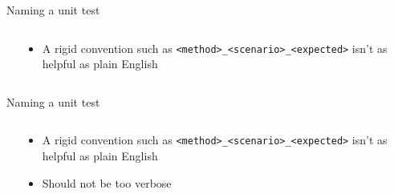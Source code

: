 \documentclass[english,handout,10pt,aspectratio=169,t]{beamer}
\begin{document}
\begin{frame}{Naming a unit test}
  \begin{columns}[T]
    \begin{column}[]{0.55\textwidth}
      \begin{minipage}{\linewidth}
        \rigidname
      \end{minipage}
    \end{column}
    \begin{column}[]{0.45\textwidth}
      \begin{itemize}
        \item A rigid convention such as \texttt{<method>\_<scenario>\_<expected>}
        isn't as helpful as plain English
      \end{itemize}
    \end{column}
  \end{columns}
\end{frame}

\begin{frame}{Naming a unit test}
  \begin{columns}[T]
    \begin{column}[]{0.55\textwidth}
      \begin{minipage}{\linewidth}
        \rigidname
        \verbosename
      \end{minipage}
    \end{column}
    \begin{column}[]{0.45\textwidth}
      \begin{itemize}
        \item A rigid convention such as \texttt{<method>\_<scenario>\_<expected>}
        isn't as helpful as plain English
        \item Should not be too verbose
      \end{itemize}
    \end{column}
  \end{columns}
\end{frame}
\end{document}
